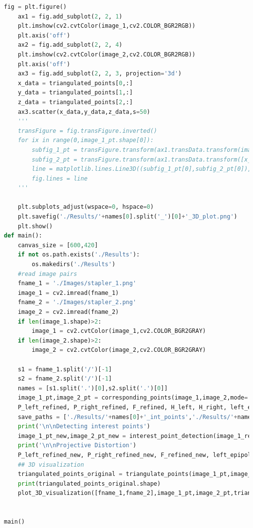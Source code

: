 \documentclass{article}
\begin{document}
\begin{lstlisting}[language=Python]
	fig = plt.figure()
	ax1 = fig.add_subplot(2, 2, 1)
	plt.imshow(cv2.cvtColor(image_1,cv2.COLOR_BGR2RGB))
	plt.axis('off')
	ax2 = fig.add_subplot(2, 2, 4)
	plt.imshow(cv2.cvtColor(image_2,cv2.COLOR_BGR2RGB))
	plt.axis('off')
	ax3 = fig.add_subplot(2, 2, 3, projection='3d')
	x_data = triangulated_points[0,:]
	y_data = triangulated_points[1,:]
	z_data = triangulated_points[2,:]
	ax3.scatter(x_data,y_data,z_data,s=50)
	'''
	transFigure = fig.transFigure.inverted()
	for ix in range(0,image_1_pt.shape[0]):
		subfig_1_pt = transFigure.transform(ax1.transData.transform(image_1_pt[ix]+[0]))
		subfig_2_pt = transFigure.transform(ax1.transData.transform([x_data[ix],y_data[ix],z_data[ix]]))
		line = matplotlib.lines.Line3D((subfig_1_pt[0],subfig_2_pt[0]),(subfig_1_pt[1],subfig_1_pt[1]),(subfig_1_pt[2],subfig_1_pt[2]), transform=fig.transFigure)
		fig.lines = line
	'''

	plt.subplots_adjust(wspace=0, hspace=0)
	plt.savefig('./Results/'+names[0].split('_')[0]+'_3D_plot.png')
	plt.show()
def main():
	canvas_size = [600,420]
	if not os.path.exists('./Results'):
		os.makedirs('./Results')
	#read image pairs
	fname_1 = './Images/stapler_1.png'
	image_1 = cv2.imread(fname_1)
	fname_2 = './Images/stapler_2.png'
	image_2 = cv2.imread(fname_2)
	if len(image_1.shape)>2:
		image_1 = cv2.cvtColor(image_1,cv2.COLOR_BGR2GRAY)
	if len(image_2.shape)>2:
		image_2 = cv2.cvtColor(image_2,cv2.COLOR_BGR2GRAY)

	s1 = fname_1.split('/')[-1]
	s2 = fname_2.split('/')[-1]
	names = [s1.split('.')[0],s2.split('.')[0]]
	image_1_pt,image_2_pt = corresponding_points(image_1,image_2,mode='manual')
	P_left_refined, P_right_refined, F_refined, H_left, H_right, left_epipole_refined, right_epipole_refined, image_1_rectified, image_2_rectified = image_rectification(image_1_pt,image_2_pt,image_1,image_2,[fname_1,fname_2],names,canvas_size)
	save_paths = ['./Results/'+names[0]+'_int_points','./Results/'+names[1]+'_int_points']
	print('\n\nDetecting interest points')
	image_1_pt_new,image_2_pt_new = interest_point_detection(image_1_rectified,image_2_rectified,[fname_1,fname_2],save_paths,names)
	print('\n\nProjective Distortion')
	P_left_refined_new, P_right_refined_new, F_refined_new, left_epipole_refined_new, right_epipole_refined_new, triangulated_points_new = projective_reconstruction(image_1_pt_new,image_2_pt_new,image_1_rectified,image_2_rectified, H_left, H_right, [fname_1,fname_2],names)
	## 3D visualization
	triangulated_points_original = triangulate_points(image_1_pt,image_2_pt,P_left_refined_new,P_right_refined_new)
	print(triangulated_points_original.shape)
	plot_3D_visualization([fname_1,fname_2],image_1_pt,image_2_pt,triangulated_points_original,names)


main()


\end{lstlisting}
\end{document}
